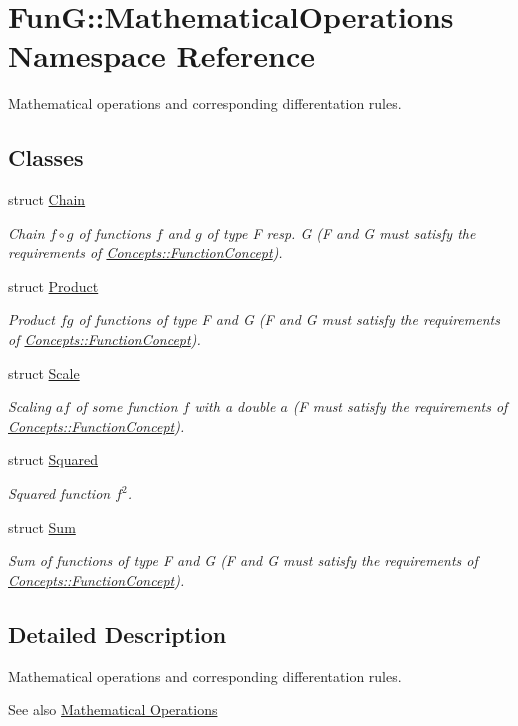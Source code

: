 \hypertarget{namespaceFunG_1_1MathematicalOperations}{\section{\-Fun\-G\-:\-:\-Mathematical\-Operations \-Namespace \-Reference}
\label{namespaceFunG_1_1MathematicalOperations}
}


\-Mathematical operations and corresponding differentation rules.  


\subsection*{\-Classes}
\begin{DoxyCompactItemize}
\item 
struct \hyperlink{structFunG_1_1MathematicalOperations_1_1Chain}{\-Chain}
\begin{DoxyCompactList}\small\item\em \-Chain $ f\circ g $ of functions $f$ and $g$ of type \-F resp. \-G (\-F and \-G must satisfy the requirements of \hyperlink{structFunG_1_1Concepts_1_1FunctionConcept}{\-Concepts\-::\-Function\-Concept}). \end{DoxyCompactList}\item 
struct \hyperlink{structFunG_1_1MathematicalOperations_1_1Product}{\-Product}
\begin{DoxyCompactList}\small\item\em \-Product $fg$ of functions of type \-F and \-G (\-F and \-G must satisfy the requirements of \hyperlink{structFunG_1_1Concepts_1_1FunctionConcept}{\-Concepts\-::\-Function\-Concept}). \end{DoxyCompactList}\item 
struct \hyperlink{structFunG_1_1MathematicalOperations_1_1Scale}{\-Scale}
\begin{DoxyCompactList}\small\item\em \-Scaling $ af $ of some function $ f $ with a double $ a $ (\-F must satisfy the requirements of \hyperlink{structFunG_1_1Concepts_1_1FunctionConcept}{\-Concepts\-::\-Function\-Concept}). \end{DoxyCompactList}\item 
struct \hyperlink{structFunG_1_1MathematicalOperations_1_1Squared}{\-Squared}
\begin{DoxyCompactList}\small\item\em \-Squared function $f^2$. \end{DoxyCompactList}\item 
struct \hyperlink{structFunG_1_1MathematicalOperations_1_1Sum}{\-Sum}
\begin{DoxyCompactList}\small\item\em \-Sum of functions of type \-F and \-G (\-F and \-G must satisfy the requirements of \hyperlink{structFunG_1_1Concepts_1_1FunctionConcept}{\-Concepts\-::\-Function\-Concept}). \end{DoxyCompactList}\end{DoxyCompactItemize}


\subsection{\-Detailed \-Description}
\-Mathematical operations and corresponding differentation rules. \begin{DoxySeeAlso}{\-See also}
\hyperlink{group__MathematicalOperationsGroup}{\-Mathematical Operations} 
\end{DoxySeeAlso}

